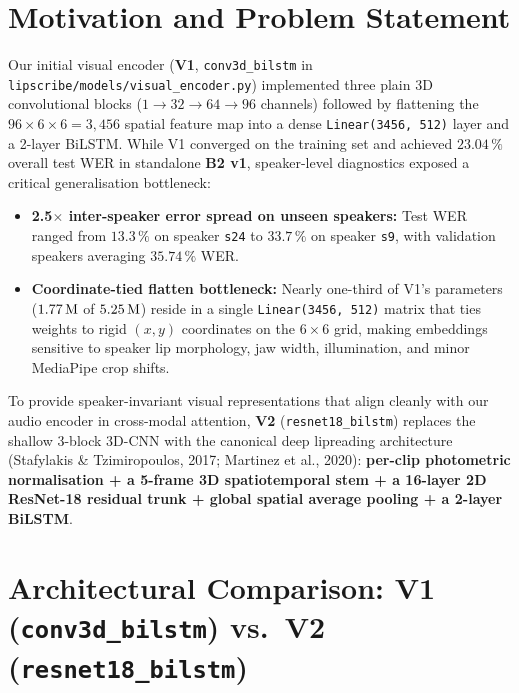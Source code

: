 \documentclass[11pt,a4paper]{article}
\newcommand{\code}[1]{\texttt{\small #1}}
\begin{document}

\section{Motivation and Problem Statement}
Our initial visual encoder (\textbf{V1}, \code{conv3d\_bilstm} in \code{lipscribe/models/visual\_encoder.py}) implemented three plain 3D convolutional blocks ($1{\to}32{\to}64{\to}96$ channels) followed by flattening the $96{\times}6{\times}6 = 3{,}456$ spatial feature map into a dense \code{Linear(3456, 512)} layer and a 2-layer BiLSTM. While V1 converged on the training set and achieved $23.04\,\%$ overall test WER in standalone \textbf{B2 v1}, speaker-level diagnostics exposed a critical generalisation bottleneck:
\begin{itemize}
  \item \textbf{2.5$\times$ inter-speaker error spread on unseen speakers:} Test WER ranged from $13.3\,\%$ on speaker \code{s24} to $33.7\,\%$ on speaker \code{s9}, with validation speakers averaging $35.74\,\%$ WER.
  \item \textbf{Coordinate-tied flatten bottleneck:} Nearly one-third of V1's parameters ($1.77\text{\,M}$ of $5.25\text{\,M}$) reside in a single \code{Linear(3456, 512)} matrix that ties weights to rigid $(x,y)$ coordinates on the $6{\times}6$ grid, making embeddings sensitive to speaker lip morphology, jaw width, illumination, and minor MediaPipe crop shifts.
\end{itemize}

To provide speaker-invariant visual representations that align cleanly with our audio encoder in cross-modal attention, \textbf{V2} (\code{resnet18\_bilstm}) replaces the shallow 3-block 3D-CNN with the canonical deep lipreading architecture (Stafylakis \& Tzimiropoulos, 2017; Martinez et al., 2020): \textbf{per-clip photometric normalisation + a 5-frame 3D spatiotemporal stem + a 16-layer 2D ResNet-18 residual trunk + global spatial average pooling + a 2-layer BiLSTM}.

\section{Architectural Comparison: V1 (\code{conv3d\_bilstm}) vs.\ V2 (\code{resnet18\_bilstm})}
\end{document}
